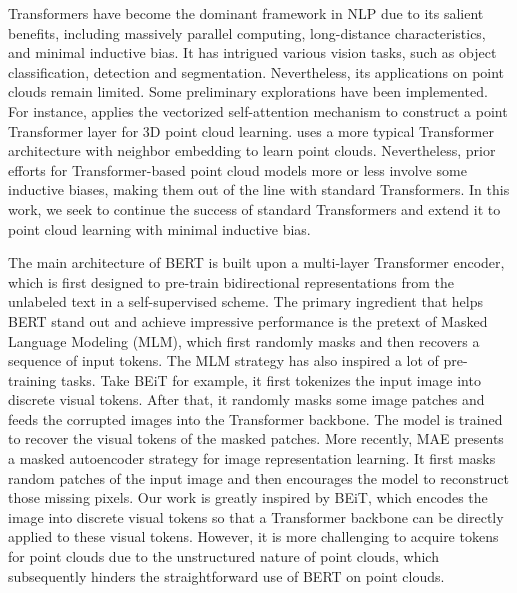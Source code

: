  Transformers\cite{vaswani2017attention} have become the dominant framework in NLP\cite{bert,brown2020language,radford2019language,joshi2020spanbert,liu2019roberta} due to its salient benefits, including massively parallel computing, long-distance characteristics, and minimal inductive bias. It has intrigued various vision tasks\cite{khan2021Transformers,han2020survey}, such as object classification\cite{vit,chen2020generative},  detection\cite{carion2020end,zhu2020deformable} and segmentation\cite{zheng2021rethinking,wang2021max}.
Nevertheless, its applications on point clouds remain limited. Some preliminary explorations have been implemented\cite{zhao2021point,guo2021pct,yu2021pointr}. For instance, \cite{zhao2021point} applies the vectorized self-attention mechanism to construct a point Transformer layer for 3D point cloud learning. \cite{guo2021pct} uses a more typical Transformer architecture with neighbor embedding to learn point clouds. Nevertheless, prior efforts for Transformer-based point cloud models more or less involve some inductive biases, making them out of the line with  standard Transformers.  In this work, we seek to continue the success of standard Transformers and extend it to point cloud learning with minimal inductive bias. 
	
 The main architecture of BERT\cite{bert} is built upon a  multi-layer Transformer encoder, which is first designed to pre-train bidirectional representations from the unlabeled text in a self-supervised scheme. The primary ingredient that helps BERT stand out and achieve impressive performance is the pretext of Masked Language Modeling (MLM), which first randomly masks and then recovers a sequence of input tokens.
	The MLM strategy has also inspired a lot of pre-training tasks\cite{joshi2020spanbert,liu2019roberta,conneau2019cross,trinh2019selfie,beit}. Take BEiT\cite{beit} for example, it first tokenizes the input image into discrete visual tokens. After that, it randomly masks some image patches and feeds the corrupted images into the Transformer backbone. The model is trained to recover the visual tokens of the masked patches.   More recently, MAE\cite{mae}  presents a masked autoencoder strategy for image representation learning. It first masks random patches of the input image and then encourages the model to reconstruct those missing pixels. Our work is greatly inspired by BEiT\cite{beit}, which encodes the image into discrete visual tokens so that a Transformer backbone can be directly applied to these visual tokens. However, it is more challenging to acquire tokens for point clouds due to the unstructured nature of point clouds, which subsequently hinders the straightforward use of BERT on point clouds. 

